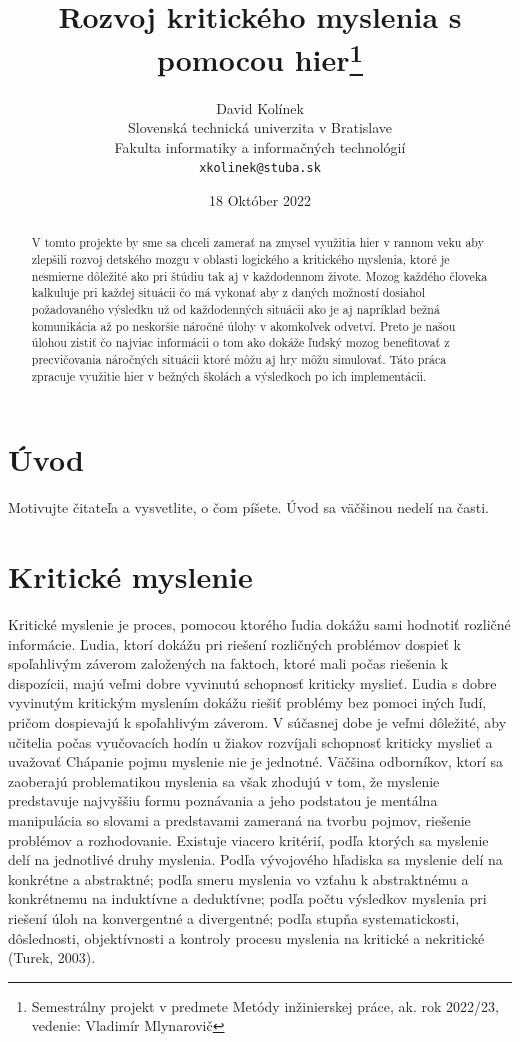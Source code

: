 \documentclass[10pt,oneside,slovak,a4paper]{article}
\title{Rozvoj kritického myslenia s pomocou hier\thanks{Semestrálny projekt v predmete Metódy inžinierskej práce, ak. rok 2022/23, vedenie: Vladimír Mlynarovič}} %
\author{David Kolínek\\[2pt]
	{\small Slovenská technická univerzita v Bratislave}\\
	{\small Fakulta informatiky a informačných technológií}\\
	{\small \texttt{xkolinek@stuba.sk}}
	}
\date{\small 18 Október 2022 } %
\begin{document}
\maketitle

\begin{abstract}
V tomto projekte by sme sa chceli zamerať na zmysel využitia hier v rannom veku aby zlepšili rozvoj 
detského mozgu v oblasti logického a kritického myslenia, ktoré je nesmierne dôležité ako pri štúdiu 
tak aj v každodennom živote. Mozog každého človeka kalkuluje pri každej situácii čo má vykonať aby 
z daných možností dosiahol požadovaného výsledku už od každodenných situácii ako je aj napríklad 
bežná komunikácia až po neskoršie náročné úlohy v akomkoľvek odvetví. Preto je našou úlohou zistiť 
čo najviac informácii o tom ako dokáže ľudský mozog benefitovať z precvičovania náročných situácii 
ktoré môžu aj hry môžu simulovať. Táto práca zpracuje využitie hier v bežných školách a výsledkoch po ich implementácii.
\end{abstract}



\section{Úvod}

Motivujte čitateľa a vysvetlite, o čom píšete. Úvod sa väčšinou nedelí na časti.

\section{Kritické myslenie}
Kritické myslenie je proces, pomocou ktorého ľudia dokážu sami hodnotiť rozličné
informácie. Ľudia, ktorí dokážu pri riešení rozličných problémov dospieť
k spoľahlivým záverom založených na faktoch, ktoré mali počas riešenia k dispozícii,
majú veľmi dobre vyvinutú schopnosť kriticky myslieť.
Ľudia s dobre vyvinutým kritickým myslením dokážu riešiť problémy bez pomoci
iných ľudí, pričom dospievajú k spoľahlivým záverom. V súčasnej dobe je veľmi
dôležité, aby učitelia počas vyučovacích hodín u žiakov rozvíjali schopnosť kriticky
myslieť a uvažovať Chápanie pojmu myslenie nie je jednotné. Väčšina odborníkov, ktorí sa zaoberajú
problematikou myslenia sa však zhodujú v tom, že myslenie predstavuje najvyššiu
formu poznávania a jeho podstatou je mentálna manipulácia so slovami
a predstavami zameraná na tvorbu pojmov, riešenie problémov a rozhodovanie.
Existuje viacero kritérií, podľa ktorých sa myslenie delí na jednotlivé druhy myslenia.
Podľa vývojového hľadiska sa myslenie delí na konkrétne a abstraktné; podľa smeru
myslenia vo vzťahu k abstraktnému a konkrétnemu na induktívne a deduktívne;
podľa počtu výsledkov myslenia pri riešení úloh na konvergentné a divergentné;
podľa stupňa systematickosti, dôslednosti, objektívnosti a kontroly procesu myslenia
na kritické a nekritické (Turek, 2003).
\end{document}
